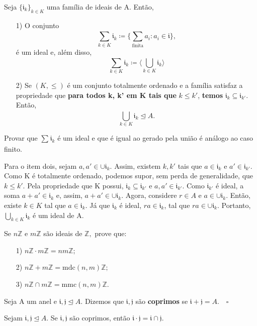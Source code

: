 \documentclass[AlgebraII/algebraII_notes.tex]{subfiles}
\begin{document}
\begin{prop*}
	Seja \(\{\mathfrak{i}_{k}\}_{k\in K}\) uma família de ideais de A. Então,
	\begin{itemize}
		\item[1)] O conjunto
		      \[
			      \sum\limits_{k\in K}^{}\mathfrak{i}_{k}\coloneqq \biggl\{\sum\limits_{\text{finita}}^{}a_{i}: a_{i}\in \mathfrak{i}\biggr\},
		      \]
		      é um ideal e, além disso,
		      \[
			      \sum\limits_{k\in K}^{}\mathfrak{i}_{k}\coloneqq \biggl\langle \bigcup_{k\in K}^{}{\mathfrak{i}_{k}} \biggr\rangle
		      \]
		\item[2)] Se \((K,\leq )\) é um conjunto totalmente ordenado e a família satisfaz a propriedade que
		      \textbf{para todos k, k' em K tais que} \(k\leq k'\), \textbf{temos} \(\mathfrak{i}_{k}\subseteq{\mathfrak{i}_{k'}}\). Então,
		      \[
			      \bigcup_{k\in K}^{}{\mathfrak{i}_{k}}\trianglelefteq{A}.
		      \]
	\end{itemize}
	\begin{proof*}
		Provar que \(\sum\limits_{}^{}\mathfrak{i}_{k}\) é um ideal e que é igual ao gerado pela união é análogo ao caso finito.

		Para o item dois, sejam \(a, a'\in \cup \mathfrak{i}_{k}.\) Assim, existem \(k, k'\) tais que \(a\in \mathfrak{i}_{k}\) e \(a'\in \mathfrak{i}_{k'}\).
		Como K é totalmente ordenado, podemos supor, sem perda de generalidade, que \(k\leq k'.\) Pela propriedade que K possui,
		\(\mathfrak{i}_{k}\subseteq{\mathfrak{i}_{k'}}\) e \(a, a'\in \mathfrak{i}_{k'}.\) Como \(\mathfrak{i}_{k'}\) é ideal, a soma
		\(a + a'\in \mathfrak{i}_{k}\) e, assim, \(a + a'\in\cup \mathfrak{i}_{k}.\) Agora, considere \(r\in A\)
		e \(a\in \cup \mathfrak{i}_{k}.\) Então, existe \(k\in K\) tal que \(a\in \mathfrak{i}_{k}\). Já que \(\mathfrak{i}_{k}\)
		é ideal, \(ra\in \mathfrak{i}_{k}\), tal que \(ra\in \cup \mathfrak{i}_{k}.\) Portanto, \(\bigcup_{k\in K}^{}{\mathfrak{i}_{k}}\) é um
		ideal de A. \qedsymbol
	\end{proof*}
\end{prop*}
\begin{example}[Exercício]
	Se \(n \mathbb{Z}\) e \(m \mathbb{Z}\) são ideais de \(\mathbb{Z},\) prove que:
	\begin{itemize}
		\item[1)] \(n \mathbb{Z}\cdot m \mathbb{Z} = nm \mathbb{Z};\)
		\item[2)] \(n \mathbb{Z} + m \mathbb{Z} = \mathrm{mdc}(n, m) \mathbb{Z};\)
		\item[3)] \(n \mathbb{Z}\cap m \mathbb{Z} = \mathrm{mmc}(n, m) \mathbb{Z}.\)
	\end{itemize}
\end{example}
\begin{def*}
	Seja A um anel e \(\mathfrak{i}, \mathfrak{j}\trianglelefteq{A}.\) Dizemos que \(\mathfrak{i}, \mathfrak{j}\) são \textbf{coprimos}
	se \(\mathfrak{i} + \mathfrak{j} = A.\quad\square\)
\end{def*}
\begin{prop*}[Exercício]
	Sejam \(\mathfrak{i}, \mathfrak{j}\trianglelefteq{A}\). Se \(\mathfrak{i}, \mathfrak{j}\) são coprimos, então \(\mathfrak{i}\cdot \mathfrak{j} = \mathfrak{i}\cap \mathfrak{j}.\)
\end{prop*}
\end{document}

